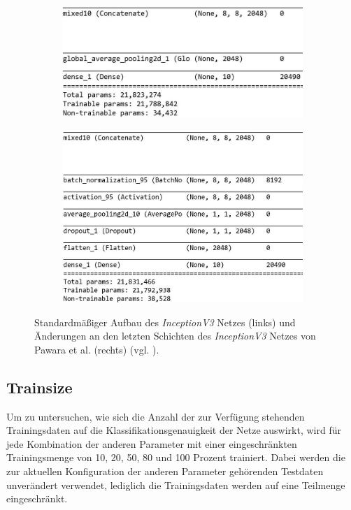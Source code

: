 \begin{figure}[H]

\begin{subfigure}{0.48\textwidth}
\includegraphics[width=\textwidth]{img/3_inception-standard.jpg}
\end{subfigure}
\hfill
\begin{subfigure}{0.48\textwidth}
\includegraphics[width=\textwidth]{img/3_inception-pawara.jpg}
\end{subfigure}



\caption{Standardmäßiger Aufbau des \textit{InceptionV3} Netzes (links) und Änderungen an den letzten Schichten des \textit{InceptionV3} Netzes von Pawara et al. (rechts) (vgl. \cite{pawaraWebsiteCode, pawaraPaper}).}
\label{fig:inceptionAenderungen}
\end{figure}


\subsection{Trainsize}
\label{ch:methodik_trainsize}
Um zu untersuchen, wie sich die Anzahl der zur Verfügung stehenden Trainingsdaten auf die Klassifikationsgenauigkeit der Netze auswirkt, wird für jede Kombination der anderen Parameter mit einer eingeschränkten Trainingsmenge von 10, 20, 50, 80 und 100 Prozent trainiert. Dabei werden die zur aktuellen Konfiguration der anderen Parameter gehörenden Testdaten unverändert verwendet, lediglich die Trainingsdaten werden auf eine Teilmenge eingeschränkt.\\

